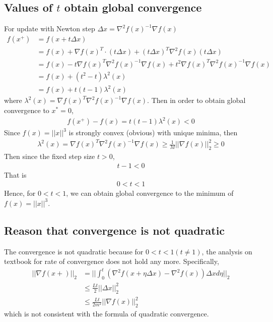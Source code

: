 \documentclass[11pt,a4paper]{article}
\begin{document}
\subsection{Values of $t$ obtain global convergence}
For update with Newton step $\Delta x = \nabla^2 f(x)^{-1} \nabla f(x)$ 
\begin{align}
    f(x^+) &= f(x + t\Delta x) \\
    &= f(x) + \nabla f(x)^T \cdot (t \Delta x) + (t\Delta x)^T \nabla^2f(x) (t\Delta x) \\
    &= f(x)-t\nabla f(x)^T \nabla^2 f(x)^{-1} \nabla f(x) + t^2 \nabla f(x)^T
    \nabla^2 f(x)^{-1} \nabla f(x) \\
    & = f(x) + (t^2 - t) \lambda^2(x) \\
    & = f(x) + t (t - 1) \lambda^2(x)
\end{align}
where $\lambda^2(x) = \nabla f(x)^T \nabla^2 f(x)^{-1}\nabla f(x) $. Then in order to
obtain global convergence to $x^* = 0$,
\begin{align}
    f(x^+) - f(x) = t (t - 1) \lambda^2(x) < 0
\end{align}
Since $f(x) = || x ||^3$ is strongly convex (obvious) with unique minima, then
\begin{align}
    \lambda^2(x) = \nabla f(x)^T \nabla^2 f(x)^{-1} \nabla f(x) 
    \geq \frac{1}{M} || \nabla f(x)||_2^2 \geq 0
\end{align}
Then since the fixed step size $t > 0$,
\begin{align}
    t - 1 < 0 
\end{align}
That is 
\begin{align}
    0 < t < 1 
\end{align}
Hence, for $ 0 < t < 1 $, we can obtain global convergence to the minimum of
$f(x) = || x ||^3$.

\subsection{Reason that convergence is not quadratic}
The convergence is not quadratic because for $ 0 < t < 1 (t \not = 1)$, the
analysis on textbook for rate of convergence does not hold any more.
Specifically, 
\begin{align}
    || \nabla f(x+) ||_2 
    &= || \int_{0}^{t} (\nabla^2f(x+\eta\Delta x) - \nabla^2f(x)) \Delta x d\eta ||_2 \\
    &\leq \frac{Lt}{2} || \Delta x ||_2^2 \\
    &\leq \frac{Lt}{2m^2} || \nabla f(x) ||_2^2 
\end{align}
which is not consistent with the formula of quadratic convergence. 
\end{document}
